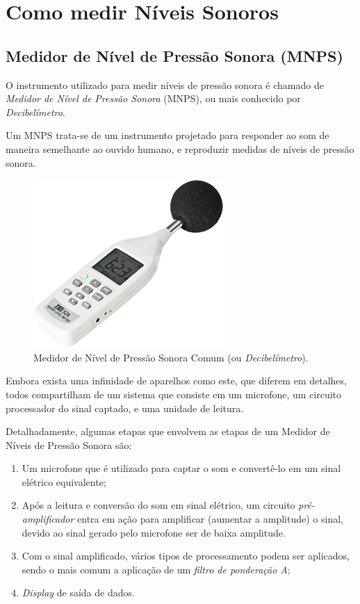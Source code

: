 \documentclass[
    12pt,               %
    openright,          %
    oneside,
    a4paper,            
    english,            %
    brazil              %
    ]{abntex2}
\begin{document}
\section{Como medir Níveis Sonoros}

\subsection{Medidor de Nível de Pressão Sonora (MNPS)}

O instrumento utilizado para medir níveis de pressão sonora é chamado de \textit{Medidor de Nível de Pressão Sonora} (MNPS), ou mais conhecido por \textit{Decibelímetro}. 

Um MNPS trata-se de um instrumento projetado para responder ao som de maneira semelhante ao ouvido humano, e reproduzir medidas de níveis de pressão sonora.


\begin{figure}[!htb]
  \caption{\label{decib} Medidor de Nível de Pressão Sonora Comum (ou \textit{Decibelímetro}).}
  \begin{center}
  \includegraphics[scale=1.1]{images/decibelimetro.jpg}
  \end{center}
\end{figure}

Embora exista uma infinidade de aparelhos como este, que diferem em detalhes, todos compartilham de um sistema que consiste em um microfone, um circuito processador do sinal captado, e uma unidade de leitura.

Detalhadamente, algumas etapas que envolvem as etapas de um Medidor de Níveis de Pressão Sonora são:

\begin{enumerate}
  \item Um microfone que é utilizado para captar o som e convertê-lo em um sinal elétrico equivalente;
  \item Após a leitura e conversão do som em sinal elétrico, um circuito \textit{pré-amplificador} entra em ação para amplificar (aumentar a amplitude) o sinal, devido ao sinal gerado pelo microfone ser de baixa amplitude.
  \item Com o sinal amplificado, vários tipos de processamento podem ser aplicados, sendo o mais comum a aplicação de um \textit{filtro de ponderação A};
  \item \textit{Display} de saída de dados.
\end{enumerate}
\end{document}
